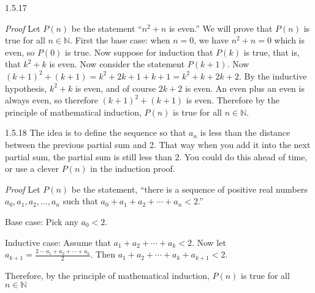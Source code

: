 \documentclass[11pt,]{book}
\makeatletter
\theoremstyle{ptxplainnotitle}
\theoremstyle{ptxplaintitle}
\renewcommand*{\proofname}{Proof}
\renewenvironment{proof}[1][\proofname]{\par
  \pushQED{\qed}%
  \normalfont \topsep6\p@\@plus6\p@\relax
  \trivlist
  \item\relax
    {\itshape
    #1\@addpunct{.}}\hspace\labelsep\ignorespaces
}{%
  \popQED\endtrivlist\@endpefalse
}
\theoremstyle{ptxdefinitionnotitle}
\theoremstyle{ptxdefinitiontitle}
\theoremstyle{ptxdefinitionnotitle}
\theoremstyle{ptxdefinitiontitle}
\theoremstyle{ptxdefinitionnotitle}
\theoremstyle{ptxdefinitiontitle}
\theoremstyle{ptxdefinitiontitlenonumber}
\theoremstyle{ptxdefinitiontitlenonumber}
\numberwithin{equation}{chapter}
\newcommand{\N}{\mathbb N}
\newcommand{\lt}{<}
\makeatother
\begin{document}
\begin{divisionexercise}{1.5.17}
\textbf{}\begin{proof}\hypertarget{proof-16}{}
\hypertarget{p-635}{}%
Let \(P(n)\) be the statement ``\(n^2 + n\) is even.'' We will prove that \(P(n)\) is true for all \(n \in \N\). First the base case: when \(n = 0\), we have \(n^2 + n = 0\) which is even, so \(P(0)\) is true. Now suppose for induction that \(P(k)\) is true, that is, that \(k^2 + k\) is even. Now consider the statement \(P(k+1)\). Now \((k+1)^2 + (k+1) = k^2 + 2k + 1 + k + 1 = k^2 + k + 2k + 2\). By the inductive hypothesis, \(k^2 + k\) is even, and of course \(2k + 2\) is even. An even plus an even is always even, so therefore \((k+1)^2 + (k+1)\) is even. Therefore by the principle of mathematical induction, \(P(n)\) is true for all \(n \in \N\).%
\end{proof}
\end{divisionexercise}%
\begin{divisionexercise}{1.5.18}
\textbf{}\hypertarget{p-637}{}%
The idea is to define the sequence so that \(a_n\) is less than the distance between the previous partial sum and 2. That way when you add it into the next partial sum, the partial sum is still less than 2. You could do this ahead of time, or use a clever \(P(n)\) in the induction proof.%
\begin{proof}\hypertarget{proof-17}{}
\hypertarget{p-638}{}%
Let \(P(n)\) be the statement, ``there is a sequence of positive real numbers \(a_0, a_1, a_2, \ldots, a_n\) such that \(a_0 + a_1 + a_2 + \cdots + a_n \lt  2\).''%
\par
\hypertarget{p-639}{}%
Base case: Pick any \(a_0 \lt  2\).%
\par
\hypertarget{p-640}{}%
Inductive case: Assume that \(a_1 + a_2 + \cdots + a_k \lt  2\). Now let \(a_{k+1} = \frac{2- a_1 + a_2 + \cdots + a_k}{2}\). Then \(a_1 + a_2 + \cdots +a_k + a_{k+1} \lt  2\).%
\par
\hypertarget{p-641}{}%
Therefore, by the principle of mathematical induction, \(P(n)\) is true for all \(n \in \N\)%
\end{proof}
\end{divisionexercise}%
\end{document}
